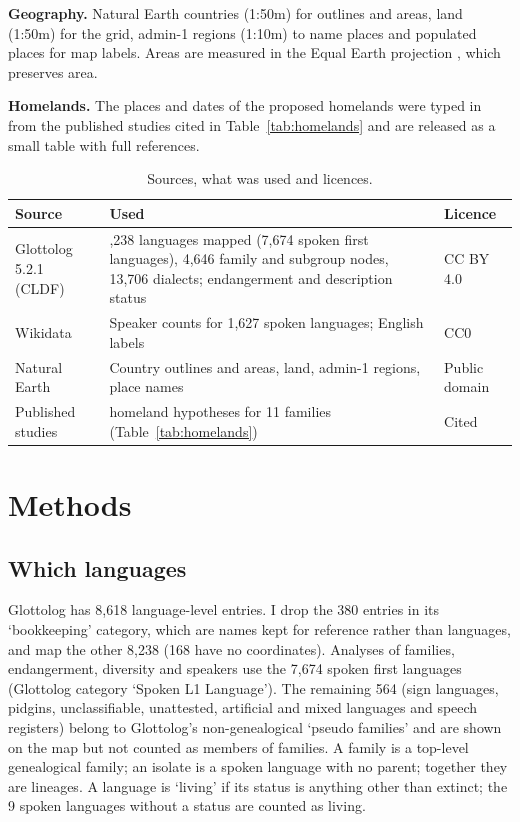 \documentclass[11pt,a4paper]{article}
\begin{document}
\textbf{Geography.} Natural Earth \citep{naturalearth} countries (1:50m) for outlines and areas, land (1:50m) for the grid, admin-1 regions (1:10m) to name places and populated places for map labels. Areas are measured in the Equal Earth projection \citep{equalearth}, which preserves area.

\textbf{Homelands.} The places and dates of the proposed homelands were typed in from the published studies cited in Table~\ref{tab:homelands} and are released as a small table with full references.

\begin{table}[tbp]\centering\small\caption{Sources, what was used and licences.}\label{tab:sources}\begin{tabular}{>{\raggedright\arraybackslash}p{3.2cm}>{\raggedright\arraybackslash}p{7.4cm}>{\raggedright\arraybackslash}p{2.6cm}}\toprule Source & Used & Licence\\\midrule
Glottolog 5.2.1 (CLDF) & 8,238 languages mapped (7,674 spoken first languages), 4,646 family and subgroup nodes, 13,706 dialects; endangerment and description status & CC BY 4.0\\
Wikidata & Speaker counts for 1,627 spoken languages; English labels & CC0\\
Natural Earth & Country outlines and areas, land, admin-1 regions, place names & Public domain\\
Published studies & 16 homeland hypotheses for 11 families (Table~\ref{tab:homelands}) & Cited\\
\bottomrule\end{tabular}\end{table}

\section{Methods}
\subsection{Which languages}
Glottolog has 8,618 language-level entries. I drop the 380 entries in its `bookkeeping' category, which are names kept for reference rather than languages, and map the other 8,238 (168 have no coordinates). Analyses of families, endangerment, diversity and speakers use the 7,674 spoken first languages (Glottolog category `Spoken L1 Language'). The remaining 564 (sign languages, pidgins, unclassifiable, unattested, artificial and mixed languages and speech registers) belong to Glottolog's non-genealogical `pseudo families' and are shown on the map but not counted as members of families. A family is a top-level genealogical family; an isolate is a spoken language with no parent; together they are lineages. A language is `living' if its status is anything other than extinct; the 9 spoken languages without a status are counted as living.
\end{document}
